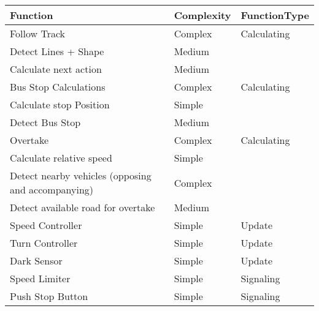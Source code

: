 \begin{table}[H]
\centering
\begin{tabular}{|l|l|l|}
\hline
\rowcolor[HTML]{FFFFFF} 
\textbf{Function}                                  & \textbf{Complexity} & \textbf{FunctionType} \\ \hline
\rowcolor[HTML]{9B9B9B} 
Follow Track                                       & Complex    & Calculating  \\ \hline
\rowcolor[HTML]{C0C0C0} 
Detect Lines + Shape                               & Medium     &              \\ \hline
\rowcolor[HTML]{C0C0C0} 
Calculate next action                              & Medium     &              \\ \hline
\rowcolor[HTML]{9B9B9B} 
Bus Stop Calculations                              & Complex    & Calculating  \\ \hline
\rowcolor[HTML]{C0C0C0} 
Calculate stop Position                            & Simple     &              \\ \hline
\rowcolor[HTML]{C0C0C0} 
Detect Bus Stop                                    & Medium     &              \\ \hline
\rowcolor[HTML]{9B9B9B} 
Overtake                                           & Complex    & Calculating  \\ \hline
\rowcolor[HTML]{C0C0C0} 
Calculate relative speed                           & Simple     &              \\ \hline
\rowcolor[HTML]{C0C0C0} 
Detect nearby vehicles (opposing and accompanying) & Complex    &              \\ \hline
\rowcolor[HTML]{C0C0C0} 
Detect available road for overtake                 & Medium     &              \\ \hline
Speed Controller                                   & Simple     & Update       \\ \hline
Turn Controller                                    & Simple     & Update       \\ \hline
Dark Sensor                                        & Simple     & Update       \\ \hline
Speed Limiter                             & Simple     & Signaling    \\ \hline
Push Stop Button                                   & Simple     & Signaling    \\ \hline

\end{tabular}
\end{table}
